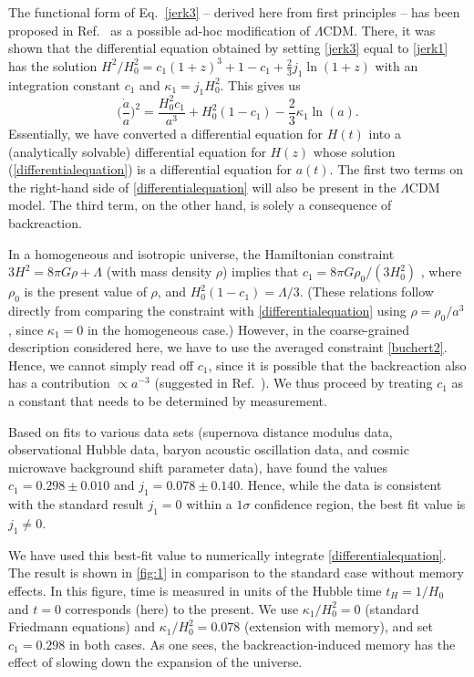 \documentclass[aps,prl,twocolumn,10pt,superscriptaddress,nofootinbib,balancelastpage]{revtex4-1}
\begin{document}
The functional form of Eq.\ \eqref{jerk3} -- derived here from first principles -- has been proposed in Ref.\ \cite{MukherjeeB2016} as a possible ad-hoc modification of $\Lambda${\sc CDM}. There, it was shown that the differential equation obtained by setting \cref{jerk3} equal to \cref{jerk1} has the solution $H^2/H_0^2 = c_1(1+z)^3+1-c_1 +\frac{2}{3} j_1 \ln(1+z)$ with an integration constant $c_1$ and $\kappa_1 = j_1 H_0^2$. This gives us 
\begin{equation}
\bigg(\frac{\dot{a}}{a}\bigg)^2 = \frac{H_0^2 c_1}{a^3} + H_0^2(1-c_1) - \frac{2}{3}\kappa_1\ln(a).
\label{differentialequation}%
\end{equation}
Essentially, we have converted a differential equation for $H(t)$ into a (analytically solvable) differential equation for $H(z)$ whose solution (\cref{differentialequation}) is a differential equation for $a(t)$.  The first two terms on the right-hand side of \cref{differentialequation} will also be present in the $\Lambda${CDM} model. The third term, on the other hand, is solely a consequence of backreaction. 

In a homogeneous and isotropic universe, the Hamiltonian constraint $3H^2=8\pi G \rho + \Lambda$ (with mass density $\rho$) implies that $c_1 = 8\pi G \rho_0/(3 H_0^2)$ \cite{MukherjeeB2016}, where $\rho_0$ is the present value of $\rho$, and $H_0^2(1-c_1) = \Lambda/3$. (These relations follow directly from comparing the constraint with \cref{differentialequation} using $\rho = \rho_0/a^3$, since $\kappa_1 = 0$ in the homogeneous case.) However, in the coarse-grained description considered here, we have to use the averaged constraint \eqref{buchert2}. Hence, we cannot simply read off $c_1$, since it is possible that the backreaction also has a contribution $\propto a^{-3}$ (suggested in Ref.\ \cite{Buchert2005}). We thus proceed by treating $c_1$ as a constant that needs to be determined by measurement. 

Based on fits to various data sets (supernova distance modulus data, observational Hubble data, baryon acoustic oscillation data, and cosmic microwave background shift parameter data), \citet{MukherjeeB2016} have found the values $c_1 = 0.298 \pm 0.010$ and $j_1 = 0.078 \pm 0.140$. Hence, while the data is consistent with the standard result $j_1 = 0$ within a $1\sigma$ confidence region, the best fit value is $j_1 \neq 0$.  

We have used this best-fit value to numerically integrate \cref{differentialequation}. The result is shown in \cref{fig:1} in comparison to the standard case without memory effects. In this figure, time is measured in units of the Hubble time $t_H = 1/H_0$ and $t=0$ corresponds (here) to the present. We use $\kappa_1/H_0^2 =0$ (standard Friedmann equations) and $\kappa_1/H_0^2 = 0.078$ (extension with memory), and set $c_1 = 0.298$ in both cases. As one sees, the backreaction-induced memory has the effect of slowing down the expansion of the universe.  
\end{document}
